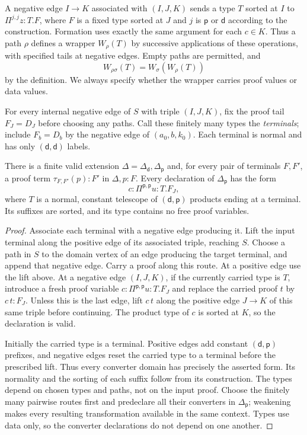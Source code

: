 A negative edge $I\longrightarrow K$ associated with $(I,J,K)$ sends a
type $T$ sorted at $I$ to
$\Pi^{j,j}z:T.F$, where $F$ is a fixed type sorted at $J$ and $j$ is
$\mathsf p$ or $\mathsf d$ according to the construction.  Formation uses
exactly the same argument for each $c\in K$.  Thus a path $\rho$ defines
a wrapper $W_\rho(T)$ by successive applications of these operations,
with specified tails at negative edges.  Empty paths are permitted, and
\[
     W_{\rho\sigma}(T)=W_\sigma(W_\rho(T))
\]
by the definition.  We always specify whether the wrapper carries proof
values or data values.

For every internal negative edge of $S$ with triple $(I,J,K)$, fix the
proof tail $F_J=D_J$ before choosing any paths. Call these finitely many types the
\emph{terminals}; include $F_b=D_b$ by the negative edge of
$(a_0,b,k_0)$.  Each terminal is normal and has only
$(\mathsf d,\mathsf d)$ labels.

\begin{lemma}
\label{lem:enc-terminal-converters}
There is a finite valid extension $\Delta=\Delta_{\mathsf d},
\Delta_{\mathsf p}$ and, for every pair of terminals $F,F'$, a proof
term $\tau_{F,F'}(p):F'$ in $\Delta,p:F$.  Every declaration of
$\Delta_{\mathsf p}$ has the form
\[
       c:\Pi^{\mathsf p,\mathsf p}u:T.F_J,
\]
where $T$ is a normal, constant telescope of
$(\mathsf d,\mathsf p)$ products ending at a terminal.  Its suffixes
are sorted, and its type contains no free proof variables.
\end{lemma}
\begin{proof}
Associate each terminal with a negative edge producing it.  Lift the input
terminal along the positive edge of its associated triple, reaching $S$.
Choose a path in $S$ to the domain vertex of an edge producing the target
terminal, and append that negative edge.  Carry a proof along this route.
At a positive edge use the lift above.  At a negative edge $(I,J,K)$,
if the currently carried type is $T$, introduce a fresh proof variable
$c:\Pi^{\mathsf p,\mathsf p}u:T.F_J$ and replace the carried proof $t$
by $c\,t:F_J$.  Unless this is the last edge, lift $c\,t$ along the
positive edge $J\longrightarrow K$ of this same triple before continuing.
The product type of $c$ is sorted at $K$, so the declaration is valid.

Initially the carried type is a terminal.  Positive edges add constant
$(\mathsf d,\mathsf p)$ prefixes, and negative edges reset the carried
type to a terminal before the prescribed lift.  Thus every converter domain
has precisely the asserted form.  Its normality and the sorting of each
suffix follow from its construction.  The types depend on chosen types and
paths, not on the input proof.  Choose the finitely many pairwise routes
first and predeclare all their converters in $\Delta_{\mathsf p}$;
weakening makes every resulting transformation available in the same
context.  Types use data only, so the converter declarations do not depend
on one another.
\end{proof}

